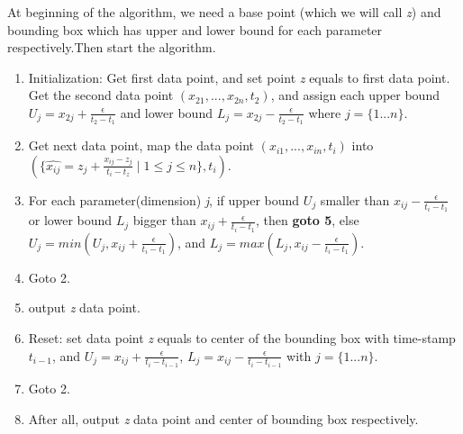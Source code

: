 \documentclass[10pt, conference, compsocconf]{IEEEtran}
\begin{document}
At beginning of the algorithm, we need a base point (which we will call \textit{z}) and bounding box which has upper and lower bound for each parameter respectively.Then start the algorithm.
\begin{enumerate}
  \item Initialization: Get first data point, and set point \textit{z} equals to first data point. Get the second data point $(x_{21},...,x_{2n},t_2)$, and assign each upper bound $U_j = x_{2j}+\frac{\epsilon}{t_2-t_1}$ and lower bound $L_j = x_{2j}-\frac{\epsilon}{t_2-t_1}$ where $j=\{1...n\}$.
  \item Get next data point, map the data point $(x_{i1},...,x_{in},t_i)$ into $(\{\hat{x_{ij}}=z_j + \frac{x_{ij}-z_{j}}{t_i-t_z} \mid1\leqslant{j}\leqslant{n}\},t_i)$.
  \item For each parameter(dimension) \textit{j}, if upper bound $U_j$ smaller than $x_{ij}-\frac{\epsilon}{t_i-t_1}$ or lower bound $L_j$ bigger than $x_{ij}+\frac{\epsilon}{t_i-t_1}$, then \textbf{goto 5}, else $U_j = min(U_j, x_{ij}+\frac{\epsilon}{t_i-t_1})$, and $L_j = max(L_j, x_{ij}-\frac{\epsilon}{t_i-t_1})$.
  \item Goto 2.
  \item output \textit{z} data point.
  \item Reset: set data point \textit{z} equals to center of the bounding box with time-stamp $t_{i-1}$, and $U_j=x_{ij}+\frac{\epsilon}{t_i-t_{i-1}}$, $L_j =x_{ij}-\frac{\epsilon}{t_i-t_{i-1}}$ with $j=\{1...n\}$.
  \item Goto 2.
  \item After all, output \textit{z} data point and center of bounding box respectively.
\end{enumerate}
\end{document}
